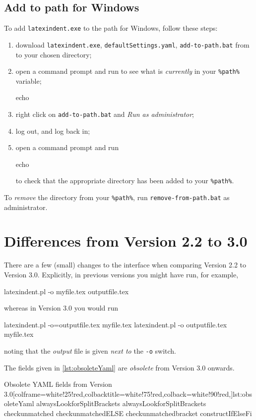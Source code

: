 	\subsection{Add to path for Windows}
		To add \texttt{latexindent.exe} to the path for Windows, follow these steps:
		\begin{enumerate}
			\item download  \texttt{latexindent.exe}, \texttt{defaultSettings.yaml},  \texttt{add-to-path.bat}
			      from \cite{latexindent-home} to your chosen directory;
			\item open a command prompt and run to see what is \emph{currently} in your \lstinline!%path%! variable;
			      \begin{dosprompt}
echo %
          \end{dosprompt}
			\item right click on \texttt{add-to-path.bat} and \emph{Run as administrator};
			\item log out, and log back in;
			\item open a command prompt and run
			      \begin{dosprompt}
echo %
          \end{dosprompt}
			      to check that the appropriate directory has been added to your \lstinline!%path%!.
		\end{enumerate}
		To \emph{remove} the directory from your \lstinline!%path%!, run \texttt{remove-from-path.bat} as administrator.

	\section{Differences from Version 2.2 to 3.0}\label{app:differences}
	 There are a few (small) changes to the interface when comparing Version 2.2 to Version 3.0.
	 Explicitly, in previous versions you might have run, for example,
	 \begin{commandshell}
latexindent.pl -o myfile.tex outputfile.tex
 \end{commandshell}
	 whereas in Version 3.0 you would run
	 \begin{commandshell}
latexindent.pl -o=outputfile.tex myfile.tex
latexindent.pl -o outputfile.tex myfile.tex
 \end{commandshell}
	 noting that the \emph{output} file is given \emph{next to} the \texttt{-o} switch.

	 The fields given in \cref{lst:obsoleteYaml} are \emph{obsolete} from Version 3.0
	 onwards.
	 \begin{yaml}[style=yaml-LST,numbers=none]{Obsolete YAML fields from Version 3.0}[colframe=white!25!red,colbacktitle=white!75!red,colback=white!90!red,]{lst:obsoleteYaml}
alwaysLookforSplitBrackets
alwaysLookforSplitBrackets
checkunmatched
checkunmatchedELSE
checkunmatchedbracket
constructIfElseFi
\end{yaml}


